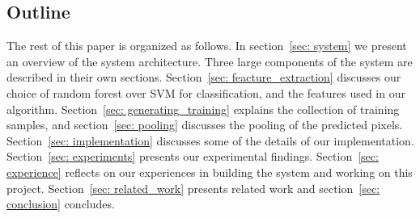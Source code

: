 \subsection{Outline}
\cutsection
The rest of this paper is organized as follows. In section~\ref{sec: system} we present an overview of the system architecture. Three large components of the system are described in their own sections. Section~\ref{sec: feacture_extraction} discusses our choice of random forest over SVM for classification, and the features used in our algorithm. Section~\ref{sec: generating_training} explains the collection of training samples, and section~\ref{sec: pooling} discusses the pooling of the predicted pixels. Section~\ref{sec: implementation} discusses some of the details of our implementation. Section~\ref{sec: experiments} presents our experimental findings. Section~\ref{sec: experience} reflects on our experiences in building the system and working on this project. Section~\ref{sec: related_work} presents related work and section~\ref{sec: conclusion} concludes. 
